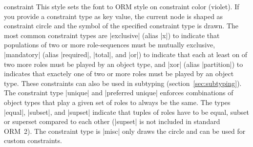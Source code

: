 \documentclass[a4paper,10pt]{article}
\begin{document}
\begin{stylekey}{constraint}
  This style sets the font to ORM style on constraint color (violet). If you provide a constraint type as key value, the current node is shaped as constraint circle and the symbol of the specified constraint type is drawn. The most common constraint types are |exclusive| (alias |x|) to indicate that populations of two or more role-sequences must be mutually exclusive, |mandatory| (alias |required|, |total|, and |or|) to indicate that each at least on of two more roles must be played by an object type, and |xor| (alias |partition|) to indicates that exactely one of two or more roles must be played by an object type. These constraints can also be used in subtyping (section~\ref{sec:subtyping}). The constraint type |unique| and |preferred unique| enforces combinations of object types that play a given set of roles to always be the same. The types |equal|, |subset|, and |supset| indicate that tuples of roles have to be equal, subset or superset compared to each other (|supset| is not included in standard ORM~2). The constraint type is |misc| only draws the circle and can be used for custom constraints.
\begin{codeexample}[]
\end{codeexample}
\end{stylekey}
\end{document}
